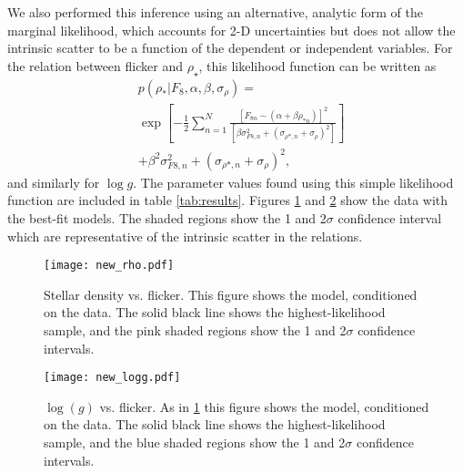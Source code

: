 \documentclass[apjl]{emulateapj}
\newcommand{\logg}{$\log g$}
\newcommand{\rhostar}{$\rho_{\star}$}
\begin{document}
We also performed this inference using an alternative, analytic form of the
marginal likelihood, which accounts for 2-D uncertainties but does not allow
the intrinsic scatter to be a function of the dependent or independent
variables.
For the relation between flicker and \rhostar, this likelihood function can be
written as
\begin{eqnarray}
	& p(\rho_*| F_8, \alpha, \beta, \sigma_{\rho}) =  \\ \nonumber
						      & \exp \left[-\frac{1}{2}
		\sum_{n=1}^N \frac{[F_{8n}-(\alpha + \beta \rho_{*n})]^2}
	{\left[\beta \sigma_{F8, n}^2 + (\sigma_{\rho *, n}
	+ \sigma_{\rho})^2\right]}\right]
	\\ \nonumber
	& + \beta^2 \sigma_{F8, n}^2 + (\sigma_{\rho *, n} + \sigma_{\rho})^2,
\end{eqnarray}
\label{eq:likelihood}
and similarly for \logg.
The parameter values found using this simple likelihood function are included
in table \ref{tab:results}.
Figures \ref{fig:rhostar} and \ref{fig:logg} show the data with the best-fit
models.
The shaded regions show the 1 and 2$\sigma$ confidence interval which are
representative of the intrinsic scatter in the relations.

\begin{figure}
\begin{center}
\texttt{[image: new\_rho.pdf]}
\caption{
Stellar density vs. flicker.
This figure shows the model, conditioned on the data.
The solid black line shows the highest-likelihood sample, and the pink shaded
regions show the 1 and 2$\sigma$ confidence intervals.}
\label{fig:rhostar}
\end{center}
\end{figure}

\begin{figure}
\begin{center}
\texttt{[image: new\_logg.pdf]}
\caption{
$\log(g)$ vs. flicker.
As in \ref{fig:rhostar} this figure shows the model, conditioned on the data.
The solid black line shows the highest-likelihood sample, and the blue shaded
regions show the 1 and 2$\sigma$ confidence intervals.}
\label{fig:logg}
\end{center}
\end{figure}
\end{document}
